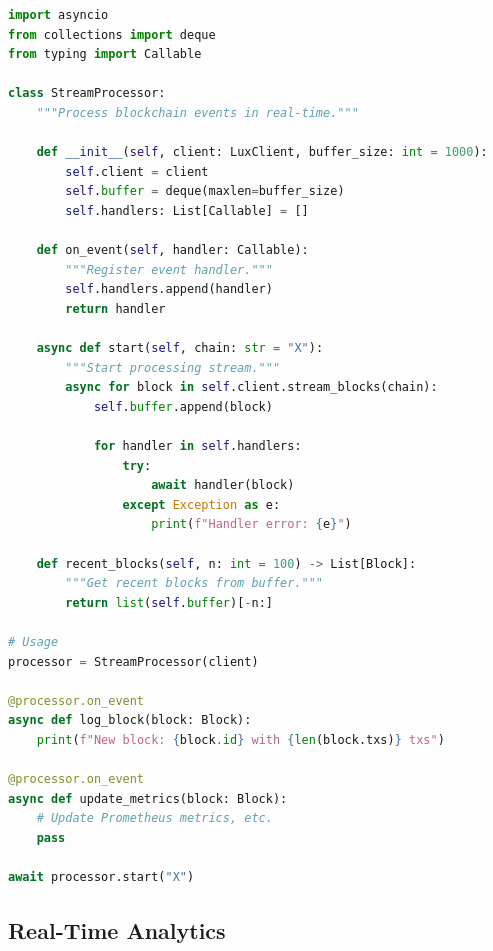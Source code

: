 \documentclass[11pt,twocolumn]{article}
\begin{document}
\begin{lstlisting}[language=Python,caption=WebSocket Streaming]
import asyncio
from collections import deque
from typing import Callable

class StreamProcessor:
    """Process blockchain events in real-time."""

    def __init__(self, client: LuxClient, buffer_size: int = 1000):
        self.client = client
        self.buffer = deque(maxlen=buffer_size)
        self.handlers: List[Callable] = []

    def on_event(self, handler: Callable):
        """Register event handler."""
        self.handlers.append(handler)
        return handler

    async def start(self, chain: str = "X"):
        """Start processing stream."""
        async for block in self.client.stream_blocks(chain):
            self.buffer.append(block)

            for handler in self.handlers:
                try:
                    await handler(block)
                except Exception as e:
                    print(f"Handler error: {e}")

    def recent_blocks(self, n: int = 100) -> List[Block]:
        """Get recent blocks from buffer."""
        return list(self.buffer)[-n:]

# Usage
processor = StreamProcessor(client)

@processor.on_event
async def log_block(block: Block):
    print(f"New block: {block.id} with {len(block.txs)} txs")

@processor.on_event
async def update_metrics(block: Block):
    # Update Prometheus metrics, etc.
    pass

await processor.start("X")
\end{lstlisting}

\subsection{Real-Time Analytics}
\end{document}
